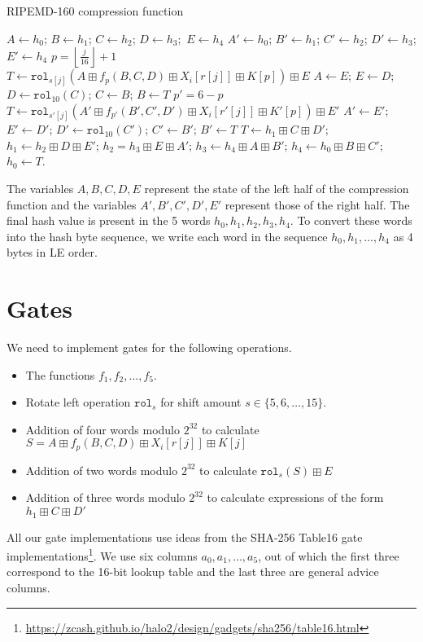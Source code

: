 \documentclass[10pt]{article}
\begin{document}
\begin{algorithm}
  \caption{RIPEMD-160 compression function}
  \begin{algorithmic}
    \State $A \gets h_0$; $B \gets h_1$; $C \gets h_2$; $D \gets h_{3};$ $E \gets h_4$
    \State $A' \gets h_0$; $B' \gets h_1$; $C' \gets h_2$; $D' \gets h_3$; $E' \gets h_4$
    \State $p = \left\lfloor \frac{j}{16}  \right\rfloor + 1$ 
    \State $T \gets \texttt{rol}_{s[j]} \left( A \boxplus f_p(B, C, D) \boxplus X_i[r[j]] \boxplus K[p]\right) \boxplus E$
    \State $A \gets E$; $E \gets D$; $D \gets \texttt{rol}_{10}(C)$; $C \gets B$; $B \gets T$
    \State $p' = 6-p$
    \State $T \gets \texttt{rol}_{s'[j]} \left( A' \boxplus f_{p'}(B', C', D') \boxplus X_i[r'[j]] \boxplus K'[p]\right) \boxplus E'$
    \State $A' \gets E'$; $E' \gets D'$; $D' \gets \texttt{rol}_{10}(C')$; $C' \gets B'$; $B' \gets T$
    \EndFor
    \State $T \gets h_1 \boxplus C \boxplus D'$; $h_1 \gets h_2 \boxplus D \boxplus E'$; $h_2 = h_3 \boxplus E \boxplus A'$;
    \State $h_3 \gets h_4 \boxplus A \boxplus B'$; $h_4 \gets h_0 \boxplus B \boxplus C'$; $h_0 \gets T$.
  \EndFor
  \end{algorithmic}
\end{algorithm}

The variables $A,B,C,D,E$ represent the state of the left half of the compression function and the variables $A',B',C',D',E'$ represent those of the right half. The final hash value is present in the 5 words $h_0, h_1, h_2, h_3, h_4$. To convert these words into the hash byte sequence, we write each word in the sequence $h_0,h_1,\ldots,h_4$ as 4 bytes in LE order.

\section{Gates}%
\label{sec:gates}
We need to implement gates for the following operations.
\begin{itemize}
  \item The functions $f_1, f_2, \ldots, f_5$.
  \item Rotate left operation $\texttt{rol}_s$ for shift amount $s \in \{5,6,\ldots,15\}$.
  \item Addition of four words modulo $2^{32}$ to calculate $S = A \boxplus f_p(B, C, D) \boxplus X_i[r[j]] \boxplus K[j]$
  \item Addition of two words modulo $2^{32}$ to calculate $\texttt{rol}_s(S) \boxplus E$
  \item Addition of three words modulo $2^{32}$ to calculate expressions of the form $h_1 \boxplus C \boxplus D'$
\end{itemize}
All our gate implementations use ideas from the SHA-256 Table16 gate implementations\footnote{\url{https://zcash.github.io/halo2/design/gadgets/sha256/table16.html}}. We use six columns $a_0, a_1, \ldots, a_5$, out of which the first three correspond to the 16-bit lookup table and the last three are general advice columns.
\end{document}
